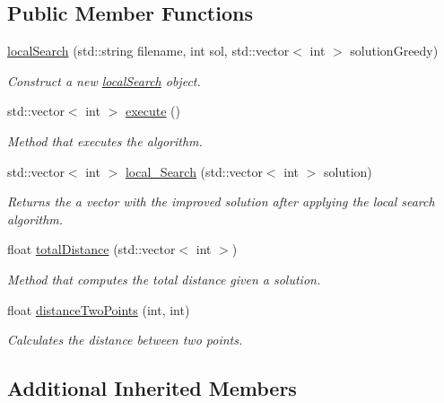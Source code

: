 \subsection*{Public Member Functions}
\begin{DoxyCompactItemize}
\item 
\hyperlink{classlocalSearch_a30b47bf0168e1ad75f42868780de1f96}{local\+Search} (std\+::string filename, int sol, std\+::vector$<$ int $>$ solution\+Greedy)
\begin{DoxyCompactList}\small\item\em Construct a new \hyperlink{classlocalSearch}{local\+Search} object. \end{DoxyCompactList}\item 
std\+::vector$<$ int $>$ \hyperlink{classlocalSearch_a0ac1d7bf221f1ab7af92f1a91017cf02}{execute} ()
\begin{DoxyCompactList}\small\item\em Method that executes the algorithm. \end{DoxyCompactList}\item 
std\+::vector$<$ int $>$ \hyperlink{classlocalSearch_afe2b71349ac06285bdccaf85847650c0}{local\+\_\+\+Search} (std\+::vector$<$ int $>$ solution)
\begin{DoxyCompactList}\small\item\em Returns the a vector with the improved solution after applying the local search algorithm. \end{DoxyCompactList}\item 
float \hyperlink{classlocalSearch_a0b14e5f24760de3ea567ff507d3a2ece}{total\+Distance} (std\+::vector$<$ int $>$)
\begin{DoxyCompactList}\small\item\em Method that computes the total distance given a solution. \end{DoxyCompactList}\item 
float \hyperlink{classlocalSearch_a5e85839cfb397c2ee38fa38bfbbc4151}{distance\+Two\+Points} (int, int)
\begin{DoxyCompactList}\small\item\em Calculates the distance between two points. \end{DoxyCompactList}\end{DoxyCompactItemize}
\subsection*{Additional Inherited Members}


